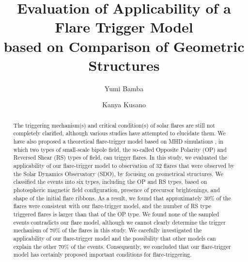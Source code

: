 \documentclass[10pt,preprint2]{aastex}
\begin{document}
\title{Evaluation of Applicability of a Flare Trigger Model\\based on Comparison of Geometric Structures}

\author{Yumi Bamba}

\author{Kanya Kusano}

\begin{abstract} %

The triggering mechanism(s) and critical condition(s) of solar flares are still not completely clarified, although various studies have attempted to elucidate them. We have also proposed a theoretical flare-trigger model based on MHD simulations \citep{kusano12}, in which two types of small-scale bipole field, the so-called Opposite Polarity (OP) and Reversed Shear (RS) types of field, can trigger flares. In this study, we evaluated the applicability of our flare-trigger model to observation of 32 flares that were observed by the Solar Dynamics Observatory (SDO), by focusing on geometrical structures. We classified the events into six types, including the OP and RS types, based on photospheric magnetic field configuration, presence of precursor brightenings, and shape of the initial flare ribbons. As a result, we found that approximately 30\% of the flares were consistent with our flare-trigger model, and the number of RS type triggered flares is larger than that of the OP type. We found none of the sampled events contradicts our flare model, although we cannot clearly determine the trigger mechanism of 70\% of the flares in this study. We carefully investigated the applicability of our flare-trigger model and the possibility that other models can explain the other 70\% of the events. Consequently, we concluded that our flare-trigger model has certainly proposed important conditions for flare-triggering.

\end{abstract}


\end{document}
